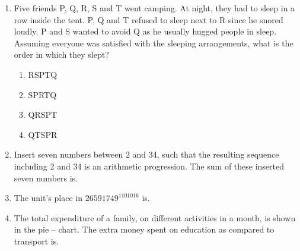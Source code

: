 \documentclass[journal]{IEEEtran}
\begin{document}
\begin{enumerate}
\item Five friends P, Q, R, S and T went camping. At night, they had to sleep in a row inside the tent. P, Q and T refused to sleep next to R since he snored loudly. P and S wanted to avoid Q as he usually hugged people in sleep.\\[0.2cm]
Assuming everyone was satisfied with the sleeping arrangements, what is the order in which they slept? \hfill {}

\begin{enumerate}
\item RSPTQ  
\item SPRTQ  
\item QRSPT  
\item QTSPR  
\end{enumerate}

\item Insert seven numbers between 2 and 34, such that the resulting sequence including 2 and 34 is an arithmetic progression. The sum of these inserted seven numbers is\underline{\hspace{1cm}}. \hfill {}

\begin{enumerate}

\end{enumerate}

\item The unit's place in $26591749^{1101016}$ is\underline{\hspace{1cm}}. \hfill {}

\begin{enumerate}
\end{enumerate}

\item The total expenditure of a family, on different activities in a month, is shown in the pie -- chart. The extra money spent on education as compared to transport  is\underline{\hspace{1cm}}. \hfill {}


\end{enumerate}
\end{document}
